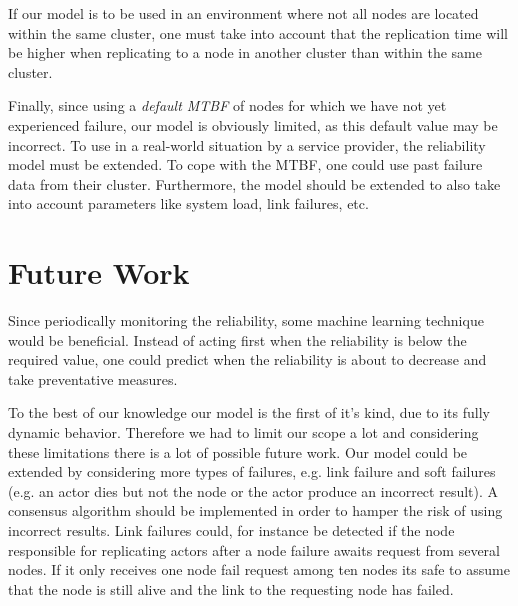 \documentclass{cslthse-msc}
\begin{document}
If our model is to be used in an environment where not all nodes are located within the same cluster, one must take into account that the replication time will be higher when replicating to a node in another cluster than within the same cluster.

Finally, since using a \emph{default MTBF} of nodes for which we have not yet experienced failure, our model is obviously limited, as this default value may be incorrect. To use in a real-world situation by a service provider, the reliability model must be extended. To cope with the MTBF, one could use past failure data from their cluster. Furthermore, the model should be extended to also take into account parameters like system load, link failures, etc. 



\chapter{Future Work} \label{ch:future_work}
Since periodically monitoring the reliability, some machine learning technique would be beneficial. Instead of acting first when the reliability is below the required value, one could predict when the reliability is about to decrease and take preventative measures.

To the best of our knowledge our model is the first of it's kind, due to its fully dynamic behavior. Therefore we had to limit our scope a lot and considering these limitations there is a lot of possible future work. Our model could be extended by considering more types of failures, e.g. link failure and soft failures (e.g. an actor dies but not the node or the actor produce an incorrect result). A consensus algorithm should be implemented in order to hamper the risk of using incorrect results. Link failures could, for instance be detected if the node responsible for replicating actors after a node failure awaits request from several nodes. If it only receives one node fail request among ten nodes its safe to assume that the node is still alive and the link to the requesting node has failed.
\end{document}
